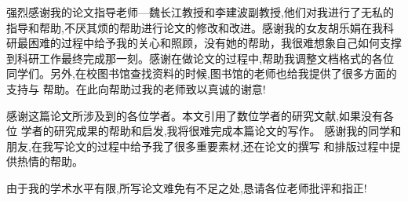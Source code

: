 
\begin{thanks}

强烈感谢我的论文指导老师—魏长江教授和李建波副教授,他们对我进行了无私的指导和帮助,不厌其烦的帮助进行论文的修改和改进。感谢我的女友胡乐娟在我科研最困难的过程中给予我的关心和照顾，没有她的帮助，我很难想象自己如何支撑到科研工作最终完成那一刻。感谢在做论文的过程中,帮助我调整文档格式的各位同学们。另外,在校图书馆查找资料的时候,图书馆的老师也给我提供了很多方面的支持与 帮助。在此向帮助过我的老师致以真诚的谢意!



感谢这篇论文所涉及到的各位学者。本文引用了数位学者的研究文献,如果没有各位 学者的研究成果的帮助和启发,我将很难完成本篇论文的写作。
感谢我的同学和朋友,在我写论文的过程中给予我了很多重要素材,还在论文的撰写 和排版过程中提供热情的帮助。

  由于我的学术水平有限,所写论文难免有不足之处,恳请各位老师批评和指正!

\end{thanks}
